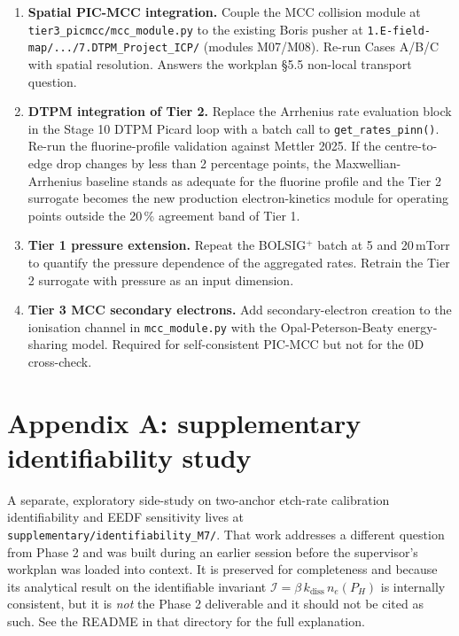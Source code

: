 \documentclass[11pt,a4paper]{article}
\newcommand{\kdiss}{k_{\mathrm{diss}}}
\begin{document}
\begin{enumerate}
  \item \textbf{Spatial PIC-MCC integration.} Couple the MCC
    collision module at \texttt{tier3\_picmcc/mcc\_module.py}
    to the existing Boris pusher at
    \texttt{1.E-field-map/.../7.DTPM\_Project\_ICP/} (modules
    M07/M08). Re-run Cases A/B/C with spatial resolution.
    Answers the workplan §5.5 non-local transport question.
  \item \textbf{DTPM integration of Tier 2.} Replace the
    Arrhenius rate evaluation block in the Stage 10 DTPM
    Picard loop with a batch call to
    \texttt{get\_rates\_pinn()}. Re-run the fluorine-profile
    validation against Mettler 2025. If the centre-to-edge
    drop changes by less than 2 percentage points, the
    Maxwellian-Arrhenius baseline stands as adequate for the
    fluorine profile and the Tier 2 surrogate becomes the new
    production electron-kinetics module for operating points
    outside the 20\,\% agreement band of Tier 1.
  \item \textbf{Tier 1 pressure extension.} Repeat the
    BOLSIG$^+$ batch at 5 and 20\,mTorr to quantify the
    pressure dependence of the aggregated rates. Retrain the
    Tier 2 surrogate with pressure as an input dimension.
  \item \textbf{Tier 3 MCC secondary electrons.} Add
    secondary-electron creation to the ionisation channel in
    \texttt{mcc\_module.py} with the Opal-Peterson-Beaty
    energy-sharing model. Required for self-consistent PIC-MCC
    but not for the 0D cross-check.
\end{enumerate}

\section*{Appendix A: supplementary identifiability study}
\label{app:m7}

A separate, exploratory side-study on two-anchor etch-rate
calibration identifiability and EEDF sensitivity lives at
\texttt{supplementary/identifiability\_M7/}. That work addresses
a different question from Phase 2 and was built during an
earlier session before the supervisor's workplan was loaded
into context. It is preserved for completeness and because
its analytical result on the identifiable invariant
$\mathcal{I} = \beta\,\kdiss\,n_e(P_H)$ is internally
consistent, but it is \emph{not} the Phase 2 deliverable and
it should not be cited as such. See the README in that
directory for the full explanation.
\end{document}
